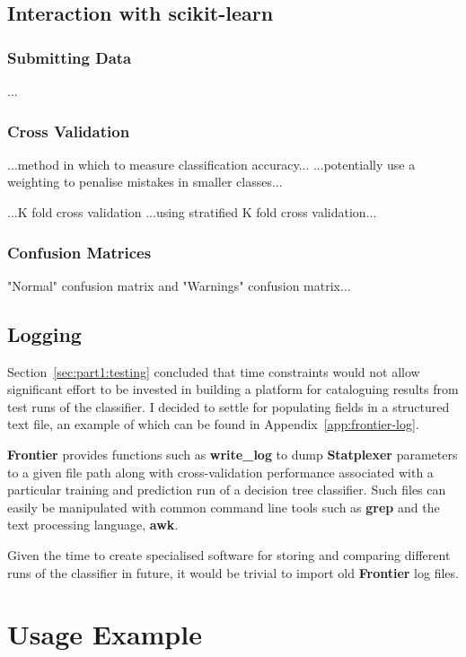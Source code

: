 \subsection{Interaction with scikit-learn}
\subsubsection{Submitting Data}
...
\subsubsection{Cross Validation}

...method in which to measure classification accuracy...
...potentially use a weighting to penalise mistakes in smaller classes...

...K fold cross validation
...using stratified K fold cross validation...

\subsubsection{Confusion Matrices}
"Normal" confusion matrix and "Warnings" confusion matrix...


\subsection{Logging}

Section~\ref{sec:part1:testing} concluded that time constraints would not allow
significant effort to be invested in building a platform for cataloguing results
from test runs of the classifier. I decided to settle for populating fields in a
structured text file, an example of which can be found in
Appendix~\ref{app:frontier-log}.

\textbf{Frontier} provides functions such as \textbf{write\_log} to dump
\textbf{Statplexer} parameters to a given file path along with cross-validation
performance associated with a particular training and prediction run of a
decision tree classifier. Such files can easily be manipulated with common
command line tools such as \textbf{grep} and the text processing language,
\textbf{awk}.

Given the time to create specialised software for storing and comparing
different runs of the classifier in future, it would be trivial to import old
\textbf{Frontier} log files.


\section{Usage Example}

